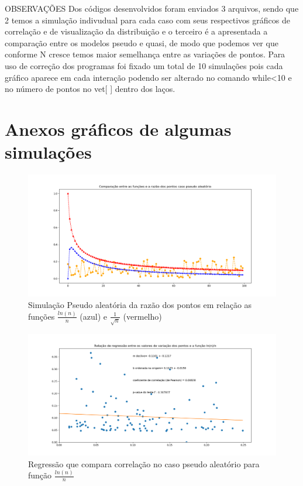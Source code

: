 \documentclass[a4paper, 12pt]{article}
\begin{document}
\textsc{OBSERVAÇÕES}
\newline
 Dos códigos desenvolvidos foram enviados 3 arquivos, sendo que 2 temos a simulação indivudual para cada caso com seus respectivos gráficos de correlação e de visualização da distribuição e o terceiro é a apresentada a comparação entre os modelos pseudo e quasi, de modo que podemos ver que conforme N cresce temos maior semelhança entre as variações de pontos. Para uso de correção dos programas foi fixado um total de 10 simulações pois cada gráfico aparece em cada interação podendo ser alterado no comando while<10 e no número de pontos no vet[ ] dentro dos laços.  
\section{Anexos gráficos de algumas simulações} 
  \begin{figure}[h]
  \centering
  \includegraphics[scale=0.40]{pseudografi.png}
  \caption{Simulação Pseudo aleatória  da razão dos pontos em relação as funções  $\frac{ln(n)}{n}$   (azul) e $\frac{1}{\sqrt{n}}$ (vermelho)}
  \label{figura:pseudografi}
  \end{figure}


 \begin{figure}[h]
  \centering
  \includegraphics[scale=0.40]{reglnpseudo.png}
  \caption{Regressão que compara correlação no caso pseudo aleatório para função $\frac{ln(n)}{n}$}
  \label{figura:reglnpseudo}
  \end{figure} 
    
\end{document}
